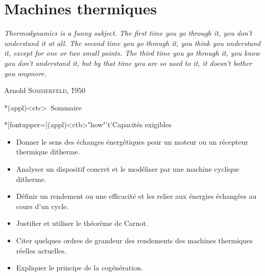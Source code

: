 \documentclass[../../main/main.tex]{subfiles}
\begin{document}
\setcounter{chapter}{4}


\chapter{Machines thermiques}
\epigraph{\openquote\textit{%
		Thermodynamics is a funny subject. The first time you go through it, you
		don't understand it at all. The second time you go through it, you think you
		understand it, except for one or two small points. The third time you go
		through it, you know you don't understand it, but by that time you are so
		used to it, it doesn't bother you anymore.
	}%
	\closequote}{Arnold \textsc{Sommerfeld}, \~1950}

\vspace*{\fill}

\begin{tcn}*(appl)<ctc>{\iconsomm~Sommaire}
	\let\item\olditem
	\vspace{-15pt}
	\minitoc
	\vspace{-25pt}
\end{tcn}

\begin{tcn}*[fontupper=\small](appl)<ctb>"how"'t'{Capacités exigibles}
	\begin{itemize}[label=\rcheck]
		\item Donner le sens des échanges énergétiques pour un moteur ou un
		      récepteur thermique ditherme.

		\item Analyser un dispositif concret et le modéliser par une machine
		      cyclique ditherme.

		\item Définir un rendement ou une efficacité et les relier aux énergies
		      échangées au cours d'un cycle.

		\item Justifier et utiliser le théorème de Carnot.

		\item Citer quelques ordres de grandeur des rendements des machines
		      thermiques réelles actuelles.

		\item Expliquer le principe de la cogénération.
	\end{itemize}
\end{tcn}

\vspace*{\fill}
\end{document}
